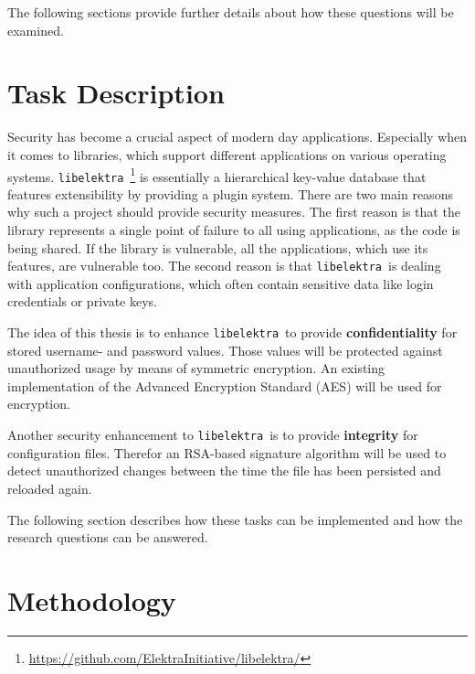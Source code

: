 \documentclass[a4paper]{article}
\newcommand{\libelektra}{\texttt{libelektra}~}
\begin{document}
The following sections provide further details about how these questions will be examined.


\section{Task Description}

Security has become a crucial aspect of modern day applications.
Especially when it comes to libraries, which support different applications on various operating systems.
\libelektra\footnote{\url{https://github.com/ElektraInitiative/libelektra/}} is essentially a hierarchical key-value database that features extensibility by providing a plugin system.
There are two main reasons why such a project should provide security measures.
The first reason is that the library represents a single point of failure to all using applications, as the code is being shared.
If the library is vulnerable, all the applications, which use its features, are vulnerable too.
The second reason is that \libelektra is dealing with application configurations, which often contain sensitive data like login credentials or private keys.

The idea of this thesis is to enhance \libelektra to provide \textbf{confidentiality} for stored username- and password values.
Those values will be protected against unauthorized usage by means of symmetric encryption.
An existing implementation of the Advanced Encryption Standard (AES) will be used for encryption.

Another security enhancement to \libelektra is to provide \textbf{integrity} for configuration files.
Therefor an RSA-based signature algorithm will be used to detect unauthorized changes between the time the file has been persisted and reloaded again.

The following section describes how these tasks can be implemented and how the research questions can be answered.


\section{Methodology}
\end{document}
